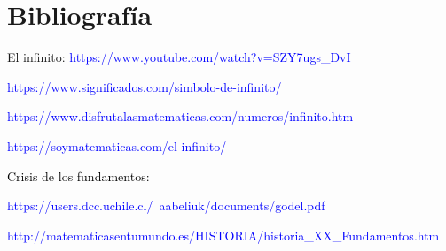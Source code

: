 \documentclass{article}
\begin{document}
\section{Bibliografía}

El infinito:
\textcolor{blue}{https://www.youtube.com/watch?v=SZY7ugs_DvI}

\textcolor{blue}{https://www.significados.com/simbolo-de-infinito/}

\textcolor{blue}{https://www.disfrutalasmatematicas.com/numeros/infinito.htm}

\textcolor{blue}{https://soymatematicas.com/el-infinito/}

\textcolor{black}{Crisis de los fundamentos:}

\textcolor{blue}{https://users.dcc.uchile.cl/~aabeliuk/documents/godel.pdf}



\textcolor{blue}{http://matematicasentumundo.es/HISTORIA/historia_XX_Fundamentos.htm}
\end{document}
